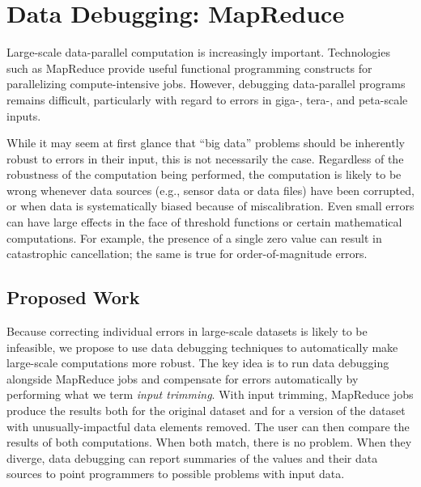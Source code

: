 \section{Data Debugging: MapReduce}

Large-scale data-parallel computation is increasingly important.
Technologies such as MapReduce provide useful functional programming
constructs for parallelizing compute-intensive jobs.  However,
debugging data-parallel programs remains difficult, particularly with
regard to errors in giga-, tera-, and peta-scale inputs. 

While it may seem at first glance that ``big data'' problems should be
inherently robust to errors in their input, this is not necessarily
the case. Regardless of the robustness of the computation being
performed, the computation is likely to be wrong whenever data sources
(e.g., sensor data or data files) have been corrupted, or when data is
systematically biased because of miscalibration. Even small errors can
have large effects in the face of threshold functions or certain
mathematical computations. For example, the presence of a single zero
value can result in catastrophic cancellation; the same is true for
order-of-magnitude errors.

\subsection{Proposed Work}

Because correcting individual errors in large-scale datasets is likely
to be infeasible, we propose to use data debugging techniques to
automatically make large-scale computations more robust. The key idea
is to run data debugging alongside MapReduce jobs and compensate for
errors automatically by performing what we term \emph{input
  trimming}. With input trimming, MapReduce jobs produce the results
both for the original dataset and for a version of the dataset with
unusually-impactful data elements removed. The user can then compare
the results of both computations. When both match, there is no
problem. When they diverge, data debugging can report summaries of the
values and their data sources to point programmers to possible
problems with input data.



